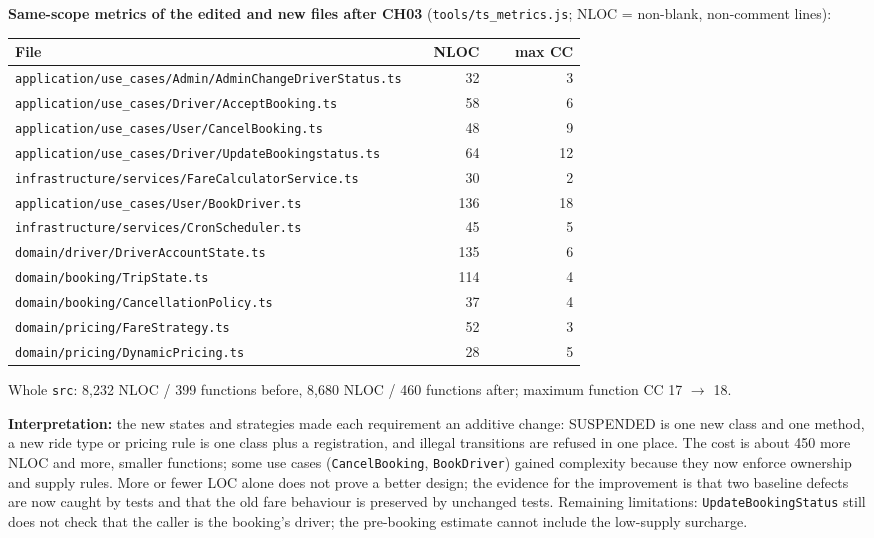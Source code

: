 \documentclass[11pt,a4paper]{article}
\begin{document}
\textbf{Same-scope metrics of the edited and new files after CH03} (\texttt{tools/ts\_metrics.js}; NLOC = non-blank, non-comment lines):
\begin{longtable}{@{}P{0.7\linewidth}rr@{}}\toprule File & NLOC & max CC\\\midrule\endhead
\texttt{application/\allowbreak{}use\_\allowbreak{}cases/\allowbreak{}Admin/\allowbreak{}AdminChangeDriverStatus.\allowbreak{}ts} & 32 & 3 \\
\texttt{application/\allowbreak{}use\_\allowbreak{}cases/\allowbreak{}Driver/\allowbreak{}AcceptBooking.\allowbreak{}ts} & 58 & 6 \\
\texttt{application/\allowbreak{}use\_\allowbreak{}cases/\allowbreak{}User/\allowbreak{}CancelBooking.\allowbreak{}ts} & 48 & 9 \\
\texttt{application/\allowbreak{}use\_\allowbreak{}cases/\allowbreak{}Driver/\allowbreak{}UpdateBookingstatus.\allowbreak{}ts} & 64 & 12 \\
\texttt{infrastructure/\allowbreak{}services/\allowbreak{}FareCalculatorService.\allowbreak{}ts} & 30 & 2 \\
\texttt{application/\allowbreak{}use\_\allowbreak{}cases/\allowbreak{}User/\allowbreak{}BookDriver.\allowbreak{}ts} & 136 & 18 \\
\texttt{infrastructure/\allowbreak{}services/\allowbreak{}CronScheduler.\allowbreak{}ts} & 45 & 5 \\
\texttt{domain/\allowbreak{}driver/\allowbreak{}DriverAccountState.\allowbreak{}ts} & 135 & 6 \\
\texttt{domain/\allowbreak{}booking/\allowbreak{}TripState.\allowbreak{}ts} & 114 & 4 \\
\texttt{domain/\allowbreak{}booking/\allowbreak{}CancellationPolicy.\allowbreak{}ts} & 37 & 4 \\
\texttt{domain/\allowbreak{}pricing/\allowbreak{}FareStrategy.\allowbreak{}ts} & 52 & 3 \\
\texttt{domain/\allowbreak{}pricing/\allowbreak{}DynamicPricing.\allowbreak{}ts} & 28 & 5 \\
\bottomrule\end{longtable}
Whole \texttt{src}: 8{,}232 NLOC / 399 functions before, 8{,}680 NLOC / 460 functions after; maximum function CC 17 $\rightarrow$ 18.

\textbf{Interpretation:} the new states and strategies made each requirement an additive change: SUSPENDED is one new class and one
method, a new ride type or pricing rule is one class plus a registration, and illegal transitions are refused in one place. The cost is
about 450 more NLOC and more, smaller functions; some use cases (\texttt{CancelBooking}, \texttt{BookDriver}) gained complexity because they
now enforce ownership and supply rules. More or fewer LOC alone does not prove a better design; the evidence for the improvement is
that two baseline defects are now caught by tests and that the old fare behaviour is preserved by unchanged tests. Remaining limitations:
\texttt{UpdateBookingStatus} still does not check that the caller is the booking's driver; the pre-booking estimate cannot include the
low-supply surcharge.
\end{document}
